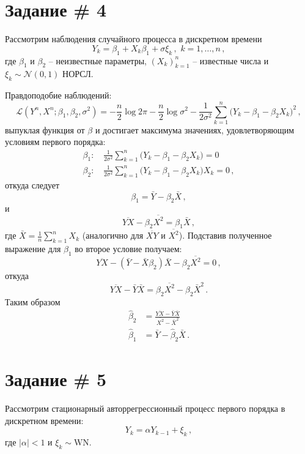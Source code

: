 \documentclass[a4paper]{article}
\begin{document}

\section{Задание \# 4} %
\label{sec:task_4}

Рассмотрим наблюдения случайного процесса в дискретном времени 
\[ Y_k = \beta_1 + X_k \beta_1 + \sigma \xi_k\,,\,\, k=1,\ldots, n\,, \]
где $\beta_1$ и $\beta_2$ -- неизвестные параметры, $(X_k)_{k=1}^n$ -- известные числа
и $\xi_k\sim \mathcal{N}(0,1)$ НОРСЛ.

Правдоподобие наблюдений:
\[
\mathcal{L}(Y^n, X^n;\beta_1, \beta_2, \sigma^2)
= -\frac{n}{2}\log 2\pi - \frac{n}{2} \log \sigma^2 - \frac{1}{2 \sigma^2} \sum_{k=1}^n \bigl(Y_k - \beta_1 - \beta_2 X_k\bigr)^2\,,
\]
выпуклая функция от $\beta$ и достигает максимума значениях, удовлетворяющим
условиям первого порядка:
\begin{align*}
	\beta_1:\,& \frac{1}{2\sigma^2} \sum_{k=1}^n \bigl(Y_k - \beta_1 - \beta_2 X_k\bigr) = 0\\
	\beta_2:\,& \frac{1}{2\sigma^2} \sum_{k=1}^n \bigl(Y_k - \beta_1 - \beta_2 X_k\bigr)X_k  = 0\,,
\end{align*}
откуда следует
\[ \beta_1 = \bar{Y} - \beta_2 \bar{X} \,, \]
и
\[ \overline{YX} - \beta_2 \overline{X^2} = \beta_1 \bar{X} \,, \]
где $\bar{X} = \tfrac{1}{n} \sum_{k=1}^n X_k$ (аналогично для $\overline{XY}$ и $\overline{X^2}$).
Подставив полученное выражение для $\beta_1$ во второе условие получаем:
\[
\overline{YX} - (\bar{Y} - \bar{X} \beta_2) \bar{X} - \beta_2 \overline{X^2} = 0 \,,
\]
откуда \[
\overline{YX} - \bar{Y}\bar{X} = \beta_2 \overline{X^2} - \beta_2 \bar{X}^2\,.
\]
Таким образом
\begin{align*}
	\hat{\beta}_2 &= \frac{\overline{YX} - \bar{Y}\bar{X}}{ \overline{X^2} - \bar{X}^2 } \\
	\hat{\beta}_1 &= \bar{Y} - \hat{\beta}_2 \bar{X}\,.
\end{align*}
 

\section{Задание \# 5} %
\label{sec:task_5}

Рассмотрим стационарный авторрегрессионный процесс первого порядка в дискретном времени:
\[ Y_k = \alpha Y_{k-1} + \xi_k\,,\]
где $|\alpha| < 1$ и $\xi_k \sim\text{WN}$.
\end{document}
